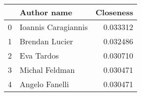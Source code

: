\begin{tabular}{llr}
\toprule
{} &          Author name &  Closeness \\
\midrule
0 &  Ioannis Caragiannis &   0.033312 \\
1 &       Brendan Lucier &   0.032486 \\
2 &           Eva Tardos &   0.030710 \\
3 &       Michal Feldman &   0.030471 \\
4 &       Angelo Fanelli &   0.030471 \\
\bottomrule
\end{tabular}
